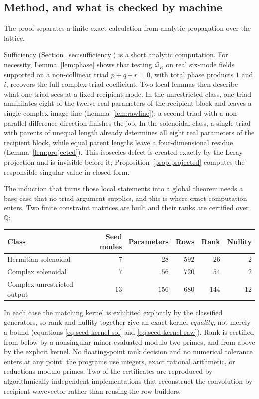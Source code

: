 \documentclass[11pt]{article}
\theoremstyle{definition}
\theoremstyle{remark}
\theoremstyle{plain}
\newcommand{\Q}{\mathbb{Q}}
\newcommand{\Qform}{\mathcal{Q}}
\begin{document}
\subsection{Method, and what is checked by machine}
\label{subsec:method}

The proof separates a finite exact calculation from analytic propagation over
the lattice.

Sufficiency (Section~\ref{sec:sufficiency}) is a short analytic computation.
For necessity, Lemma~\ref{lem:phase} shows that testing $\Qform_{R}$ on real
six-mode fields supported on a non-collinear triad $p+q+r=0$, with total phase
products $1$ and $i$, recovers the full complex triad coefficient. Two local
lemmas then describe what one triad sees at a fixed recipient mode. In the
unrestricted class, one triad annihilates eight of the twelve real parameters
of the recipient block and leaves a single complex image line
(Lemma~\ref{lem:rawline}); a second triad with a non-parallel difference
direction finishes the job. In the solenoidal class, a single triad with
parents of unequal length already determines all eight real parameters of the
recipient block, while equal parent lengths leave a four-dimensional residue
(Lemma~\ref{lem:projected}). This isosceles defect is created exactly by the
Leray projection and is invisible before it; Proposition~\ref{prop:projected}
computes the responsible singular value in closed form.

The induction that turns those local statements into a global theorem needs a
base case that no triad argument supplies, and this is where exact computation
enters. Two finite constraint matrices are built and their ranks are certified
over $\Q$:
\begin{center}
\begin{tabular}{lrrrrr}
\hline
Class & Seed modes & Parameters & Rows & Rank & Nullity\\
\hline
Hermitian solenoidal & $7$ & $28$ & $592$ & $26$ & $2$\\
Complex solenoidal & $7$ & $56$ & $720$ & $54$ & $2$\\
Complex unrestricted output & $13$ & $156$ & $680$ & $144$ & $12$\\
\hline
\end{tabular}
\end{center}
In each case the matching kernel is exhibited explicitly by the classified
generators, so rank and nullity together give an exact kernel \emph{equality},
not merely a bound (equations \eqref{eq:seed-kernel-sol} and
\eqref{eq:seed-kernel-raw}). Rank is certified from below by a nonsingular
minor evaluated modulo two primes, and from above by the explicit kernel. No
floating-point rank decision and no numerical tolerance enters at any point:
the programs use integers, exact rational arithmetic, or reductions modulo
primes. Two of the certificates are reproduced by algorithmically independent
implementations that reconstruct the convolution by recipient wavevector
rather than reusing the row builders.
\end{document}
